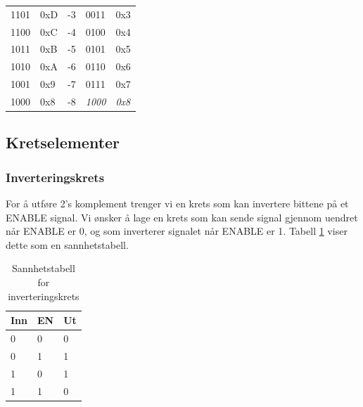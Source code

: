\documentclass[11pt, a4paper, norwegian]{article}
\begin{document}
\begin{table}[h]
\begin{tabular}{|l|l|l||l|l|}
1101      & 0xD          & -3      & 0011                                                      & 0x3                                                          \\
1100      & 0xC          & -4      & 0100                                                      & 0x4                                                          \\
1011      & 0xB          & -5      & 0101                                                      & 0x5                                                          \\
1010      & 0xA          & -6      & 0110                                                      & 0x6                                                          \\
1001      & 0x9          & -7      & 0111                                                      & 0x7                                                            \\
1000      & 0x8          & -8      & \textit{1000}                                             & \textit{0x8}                                                         \\ \hline
\end{tabular}
\end{table}


\subsection{Kretselementer}
\subsubsection{Inverteringskrets}
For å utføre 2's komplement trenger vi en krets som kan invertere bittene på et ENABLE signal.
Vi ønsker å lage en krets som kan sende signal gjennom uendret når ENABLE er 0, og som inverterer signalet når ENABLE er 1. Tabell \ref{tbl_xor} viser dette som en sannhetstabell. 

\begin{table}[h]
  \centering
  \caption{Sannhetstabell for inverteringskrets}
  \label{tbl_xor}
  \begin{tabular}{|l|l||l|}
  \hline
  Inn   & EN & Ut    \\ \hline
  0     & 0  & 0     \\
  0     & 1  & 1     \\
  1     & 0  & 1     \\
  1     & 1  & 0     \\ \hline
  \end{tabular}
\end{table}
\end{document}
